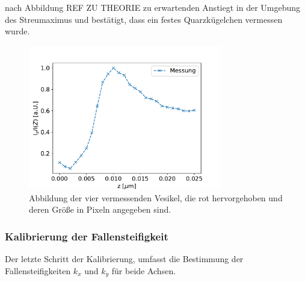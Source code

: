             nach Abbildung REF ZU THEORIE zu erwartenden Anstiegt in der Umgebung des Streumaximus und bestätigt, dass ein festes Quarzkügelchen vermessen wurde.
            \begin{figure}[h]
            \centering
            \includegraphics[width = 0.75\textwidth]{Diodensumme.pdf}
            \caption{Abbildung der vier vermessenden Vesikel, die rot hervorgehoben und deren Größe in Pixeln angegeben sind.}
            \label{fig:Diodensumme}
            \end{figure}
            \FloatBarrier


            
        \subsubsection{Kalibrierung der Fallensteifigkeit}
            Der letzte Schritt der Kalibrierung, umfasst die Bestimmung der Fallensteifigkeiten $k_x$ und $k_y$ für beide Achsen.
            
